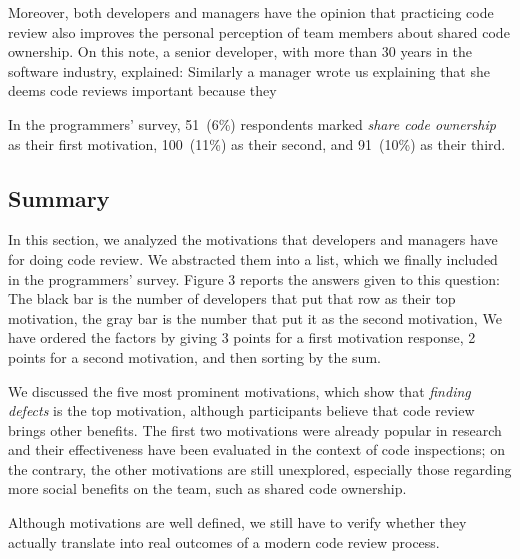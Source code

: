 Moreover, both developers and managers have the opinion that practicing code
review also improves the personal perception of team members about shared code
ownership. On this note, a senior developer, with more than 30 years in the
software industry, explained:  Similarly a manager wrote us explaining that she deems code
reviews important because they 

In the programmers' survey, 51~(6\%) respondents marked \emph{share code
ownership} as their first motivation, 100~(11\%) as their second, and 91~(10\%)
as their third.

\subsection{Summary}

In this section, we analyzed the motivations that developers and managers have
for doing code review. We abstracted them into a list, which we finally
included in the programmers' survey. Figure 3 reports the answers given to this
question: The black bar is the number of developers that put that row as their
top motivation, the gray bar is the number that put it as the second
motivation, \etc We have ordered the factors by giving 3 points for a first
motivation response, 2 points for a second motivation, \etc and then sorting by
the sum. 

We discussed the five most prominent motivations, which show that \emph{finding
defects} is the top motivation, although participants believe that code review
brings other benefits. The first two motivations were already popular in
research and their effectiveness have been evaluated in the context of code
inspections; on the contrary, the other motivations are still unexplored,
especially those regarding more social benefits on the team, such as shared
code ownership.

Although motivations are well defined, we still have to verify whether they
actually translate into real outcomes of a modern code review process. 
